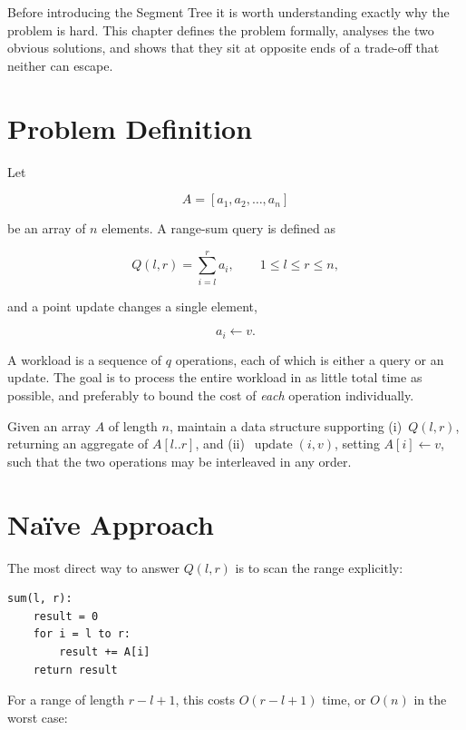 \documentclass[
  11pt,
  a4paper,
  twoside=false,
  numbers=noenddot,
  headings=big,
  parskip=half,
  toc=bibliography,
  toc=listof,
  bibliography=totoc
]{scrreprt}
\begin{document}
Before introducing the Segment Tree it is worth understanding exactly why the problem is hard. This chapter defines the problem formally, analyses the two obvious solutions, and shows that they sit at opposite ends of a trade-off that neither can escape.

\section{Problem Definition}
Let

\begin{equation}
A = [a_1, a_2, \ldots, a_n]
\end{equation}

be an array of $n$ elements. A range-sum query is defined as

\begin{equation}
Q(l,r) = \sum_{i=l}^{r} a_i, \qquad 1 \le l \le r \le n,
\end{equation}

and a point update changes a single element,

\begin{equation}
a_i \leftarrow v.
\end{equation}

A workload is a sequence of $q$ operations, each of which is either a query or an update. The goal is to process the entire workload in as little total time as possible, and preferably to bound the cost of \emph{each} operation individually.

\begin{defn}
Given an array $A$ of length $n$, maintain a data structure supporting (i)~$Q(l,r)$, returning an aggregate of $A[l..r]$, and (ii)~$\operatorname{update}(i,v)$, setting $A[i]\leftarrow v$, such that the two operations may be interleaved in any order.
\end{defn}

\section{Na\"ive Approach}
The most direct way to answer $Q(l,r)$ is to scan the range explicitly:

\begin{lstlisting}
sum(l, r):
    result = 0
    for i = l to r:
        result += A[i]
    return result
\end{lstlisting}

For a range of length $r-l+1$, this costs $O(r-l+1)$ time, or $O(n)$ in the worst case:
\end{document}
